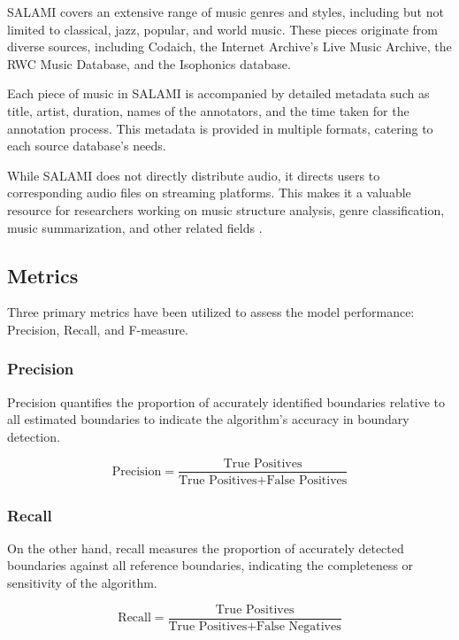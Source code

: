 SALAMI covers an extensive range of music genres and styles, including but not limited to classical, jazz, popular, and world music. These pieces originate from diverse sources, including Codaich, the Internet Archive's Live Music Archive, the RWC Music Database, and the Isophonics database.

Each piece of music in SALAMI is accompanied by detailed metadata such as title, artist, duration, names of the annotators, and the time taken for the annotation process. This metadata is provided in multiple formats, catering to each source database's needs.

While SALAMI does not directly distribute audio, it directs users to corresponding audio files on streaming platforms. This makes it a valuable resource for researchers working on music structure analysis, genre classification, music summarization, and other related fields \cite{Smith2011DESIGNANNOTATIONS}.

\subsection{Metrics}

Three primary metrics have been utilized to assess the model performance: Precision, Recall, and F-measure. 

\subsubsection{Precision}

Precision quantifies the proportion of accurately identified boundaries relative to all estimated boundaries to indicate the algorithm's accuracy in boundary detection.

\begin{equation}
\text{Precision} = \frac{\text{True Positives}}{\text{True Positives} + \text{False Positives}}
\end{equation}

\subsubsection{Recall}

On the other hand, recall measures the proportion of accurately detected boundaries against all reference boundaries, indicating the completeness or sensitivity of the algorithm.

\begin{equation}
\text{Recall} = \frac{\text{True Positives}}{\text{True Positives} + \text{False Negatives}}
\end{equation}

